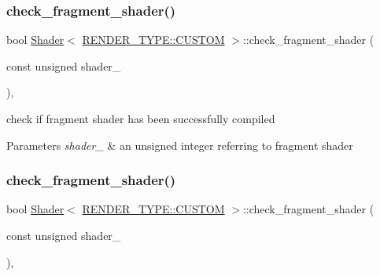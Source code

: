 \subsubsection{\texorpdfstring{check\+\_\+fragment\+\_\+shader()}{check\_fragment\_shader()}\hspace{0.1cm}{\footnotesize\ttfamily [1/2]}}
{\footnotesize\ttfamily bool \mbox{\hyperlink{classShader}{Shader}}$<$ \mbox{\hyperlink{shader__class_8hpp_a24e288e18eb7b6e01de7565001fedb60a72baef04098f035e8a320b03ad197818}{R\+E\+N\+D\+E\+R\+\_\+\+T\+Y\+P\+E\+::\+C\+U\+S\+T\+OM}} $>$\+::check\+\_\+fragment\+\_\+shader (\begin{DoxyParamCaption}\item[{const unsigned}]{shader\+\_\+ }\end{DoxyParamCaption})\hspace{0.3cm}{\ttfamily [inline]}, {\ttfamily [protected]}}



check if fragment shader has been successfully compiled 


\begin{DoxyParams}{Parameters}
{\em shader\+\_\+} & an unsigned integer referring to fragment shader \\
\hline
\end{DoxyParams}
\mbox{\label{classShader_3_01RENDER__TYPE_1_1CUSTOM_01_4_a8ba4a9ccbbf73e471434981a62b15d41}} 
\subsubsection{\texorpdfstring{check\+\_\+fragment\+\_\+shader()}{check\_fragment\_shader()}\hspace{0.1cm}{\footnotesize\ttfamily [2/2]}}
{\footnotesize\ttfamily bool \mbox{\hyperlink{classShader}{Shader}}$<$ \mbox{\hyperlink{shader__class_8hpp_a24e288e18eb7b6e01de7565001fedb60a72baef04098f035e8a320b03ad197818}{R\+E\+N\+D\+E\+R\+\_\+\+T\+Y\+P\+E\+::\+C\+U\+S\+T\+OM}} $>$\+::check\+\_\+fragment\+\_\+shader (\begin{DoxyParamCaption}\item[{const unsigned}]{shader\+\_\+ }\end{DoxyParamCaption})\hspace{0.3cm}{\ttfamily [inline]}, {\ttfamily [protected]}}



